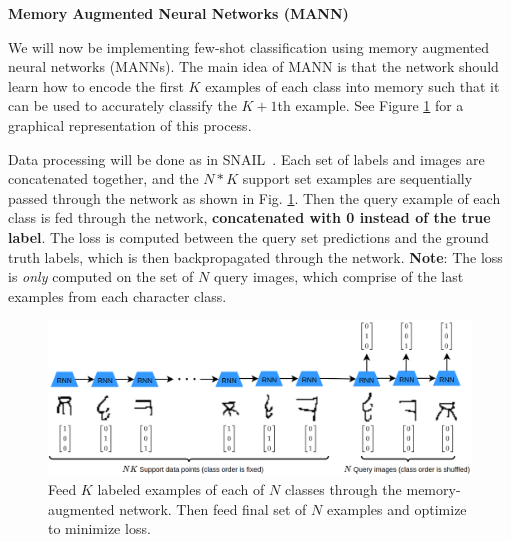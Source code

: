 \item {} {\bf Memory Augmented Neural Networks (MANN)     \cite{pmlr-v48-santoro16,DBLP:journals/corr/MishraRCA17}}

We will now be implementing few-shot classification using memory augmented neural networks (MANNs). The main idea of MANN is that the network should learn how to encode the first $K$ examples of each class into memory such that it can be used to accurately classify the $K+1$th example. See Figure \ref{mann} for a graphical representation of this process.

Data processing will be done as in SNAIL~\cite{DBLP:journals/corr/MishraRCA17}. Each set of labels and images are concatenated together, and the $N*K$ support set examples are sequentially passed through the network as shown in Fig. \ref{mann}. Then the query example of each class is fed through the network, \textbf{concatenated with 0 instead of the true label}. The loss is computed between the query set predictions and the ground truth labels, which is then backpropagated through the network. \textbf{Note}: The loss is \textit{only} computed on the set of $N$ query images, which comprise of the last examples from each character class. 

\begin{figure}
\centering
\includegraphics[width=\linewidth]{./figures/ps2seq}
\vspace{-9mm}
\caption{Feed $K$ labeled examples of each of $N$ classes through the memory-augmented network. Then feed final set of $N$ examples and optimize to minimize loss.}
\label{mann}
\end{figure}


